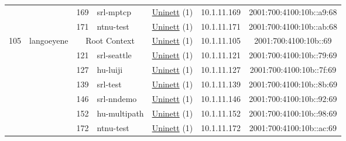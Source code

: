 \begin{small}
\begin{center}
\begin{longtable}{|c|c|c|c|c|c|c|c|}
  &  & \tiny{169} & \multicolumn{1}{|l|}{\tiny{srl-mptcp}} & \multicolumn{2}{|c|}{\tiny{\href{https://www.uninett.no}{Uninett} (1)}} & \tiny{10.1.11.169} & \tiny{2001:700:4100:10b::a9:68} \\* \cline{3-3}\cline{4-4}\cline{5-5}\cline{6-6}\cline{7-7}\cline{8-8}
  &  & \tiny{171} & \multicolumn{1}{|l|}{\tiny{ntnu-test}} & \multicolumn{2}{|c|}{\tiny{\href{https://www.uninett.no}{Uninett} (1)}} & \tiny{10.1.11.171} & \tiny{2001:700:4100:10b::ab:68} \\ \hline
 \multirow{7}{*}{\tiny{105}} & \multicolumn{1}{|l|}{\multirow{7}{*}{\tiny{langoeyene}}} & \multicolumn{2}{|c|}{\tiny{Root Context}} & \multicolumn{2}{|c|}{\tiny{\href{https://www.uninett.no}{Uninett} (1)}} & \tiny{10.1.11.105} & \tiny{2001:700:4100:10b::69} \\* \cline{3-3}\cline{4-4}\cline{5-5}\cline{6-6}\cline{7-7}\cline{8-8}
  &  & \tiny{121} & \multicolumn{1}{|l|}{\tiny{srl-seattle}} & \multicolumn{2}{|c|}{\tiny{\href{https://www.uninett.no}{Uninett} (1)}} & \tiny{10.1.11.121} & \tiny{2001:700:4100:10b::79:69} \\* \cline{3-3}\cline{4-4}\cline{5-5}\cline{6-6}\cline{7-7}\cline{8-8}
  &  & \tiny{127} & \multicolumn{1}{|l|}{\tiny{hu-luiji}} & \multicolumn{2}{|c|}{\tiny{\href{https://www.uninett.no}{Uninett} (1)}} & \tiny{10.1.11.127} & \tiny{2001:700:4100:10b::7f:69} \\* \cline{3-3}\cline{4-4}\cline{5-5}\cline{6-6}\cline{7-7}\cline{8-8}
  &  & \tiny{139} & \multicolumn{1}{|l|}{\tiny{srl-test}} & \multicolumn{2}{|c|}{\tiny{\href{https://www.uninett.no}{Uninett} (1)}} & \tiny{10.1.11.139} & \tiny{2001:700:4100:10b::8b:69} \\* \cline{3-3}\cline{4-4}\cline{5-5}\cline{6-6}\cline{7-7}\cline{8-8}
  &  & \tiny{146} & \multicolumn{1}{|l|}{\tiny{srl-nndemo}} & \multicolumn{2}{|c|}{\tiny{\href{https://www.uninett.no}{Uninett} (1)}} & \tiny{10.1.11.146} & \tiny{2001:700:4100:10b::92:69} \\* \cline{3-3}\cline{4-4}\cline{5-5}\cline{6-6}\cline{7-7}\cline{8-8}
  &  & \tiny{152} & \multicolumn{1}{|l|}{\tiny{hu-multipath}} & \multicolumn{2}{|c|}{\tiny{\href{https://www.uninett.no}{Uninett} (1)}} & \tiny{10.1.11.152} & \tiny{2001:700:4100:10b::98:69} \\* \cline{3-3}\cline{4-4}\cline{5-5}\cline{6-6}\cline{7-7}\cline{8-8}
  &  & \tiny{172} & \multicolumn{1}{|l|}{\tiny{ntnu-test}} & \multicolumn{2}{|c|}{\tiny{\href{https://www.uninett.no}{Uninett} (1)}} & \tiny{10.1.11.172} & \tiny{2001:700:4100:10b::ac:69} \\ \hline

\end{longtable}
\end{center}
\end{small}

